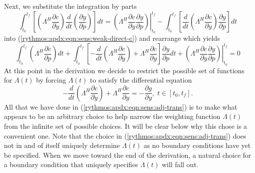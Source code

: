 \documentclass[pdf,ps2pdf,11pt]{SANDreport}
\begin{document}
Next, we substitute the integration by parts
%
\begin{equation}
\int_{t_0}^{t_f} \left[ \left( \Lambda^H \frac{\partial c}{\partial \dot{y}} \right) \frac{d}{dt}\left( \frac{\partial y}{\partial p} \right) \right] dt
= \left. \left( \Lambda^H \frac{\partial c}{\partial \dot{y}} \frac{\partial y}{\partial p} \right) \right|_{t_0}^{t_f}
- \int_{t_0}^{t_f} \left[ \frac{d}{dt}\left( \Lambda^H \frac{\partial c}{\partial \dot{y}} \right) \frac{\partial y}{\partial p} \right] dt
\end{equation}
%
into (\ref{rythmos:apdx:eqn:sens:weak-direct-c}) and rearrange which yields
%
\begin{equation}
\int_{t_0}^{t_f} \left( \Lambda^H \frac{\partial c}{\partial p} \right) dt
+ \int_{t_0}^{t_f} \left[
    - \frac{d}{dt}\left( \Lambda^H \frac{\partial c}{\partial \dot{y}} \right)
    + \Lambda^H \frac{\partial c}{\partial y}
  \right] \frac{\partial y}{\partial p} dt
+ \left. \left( \Lambda^H \frac{\partial c}{\partial \dot{y}} \frac{\partial y}{\partial p} \right) \right|_{t_0}^{t_f}
= 0
\label{rythmos:apdx:eqn:sens:weak-direct-c-2}
\end{equation}
%
At this point in the derivation we decide to restrict the possible set of
functions for $\Lambda(t)$ by forcing $\Lambda(t)$ to satisfy the differential
equation
%
\begin{equation}
- \frac{d}{dt}\left( \Lambda^H \frac{\partial c}{\partial \dot{y}} \right)
+  \Lambda^H \frac{\partial c}{\partial y} = - \frac{\partial g}{\partial y}, \; t \in \left[ t_0, t_f \right].
\label{rythmos:apdx:eqn:sens:adj-trans}
\end{equation}
%
All that we have done in (\ref{rythmos:apdx:eqn:sens:adj-trans}) is to make
what appears to be an arbitrary choice to help narrow the weighting function
$\Lambda(t)$ from the infinite set of possible choices.  It will be clear
below why this chose is a convenient one.  Note that the choice in
(\ref{rythmos:apdx:eqn:sens:adj-trans}) does not in and of itself uniquely
determine $\Lambda(t)$ as no boundary conditions have yet be specified.  When
we move toward the end of the derivation, a natural choice for a boundary
condition that uniquely specifies $\Lambda(t)$ will fall out.
\end{document}
